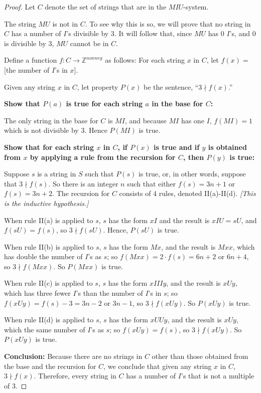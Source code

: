 \documentclass[14pt]{extarticle}
\newcommand{\Z}{\mathbb{Z}}
\begin{document}
\begin{proof}
Let $C$ denote the set of strings that are in the $M I U$-system.

The string $MU$ is not in $C$. To see why this is so, we will prove that no string in $C$ has a number of $I$'s 
divisible by 3. It will follow that, since $MU$ has 0 $I$'s, and 0 is divisible by 3, $MU$  cannot be in $C$.

Define a function \(f: C \to \Z^{nonneg}\) as follows: For each string $x$ in $C$, let \(f(x) = \) [the number of $I$'s in $x$].

Given any string $x$ in $C$, let property $P(x)$ be the sentence, “\(3 \nmid f(x)\).”

{\bf Show that $P(a)$ is true for each string $a$ in the base for $C$:}

The only string in the base for $C$ is $MI$, and because $MI$ has one $I$, $f(MI) = 1$ which is not divisible by 3. Hence $P(MI)$ is true. 

{\bf Show that for each string $x$ in $C$, if $P(x)$ is true and if $y$ is obtained from $x$ by applying a rule 
from the recursion for $C$, then $P(y)$ is true:}

Suppose $s$ is a string in $S$ such that $P(s)$ is true, or, in other words, suppose that $3 \nmid f(s)$. So there 
is an integer $n$ such that either \(f(s) = 3n+1\) or \(f(s) = 3n+2\). The recursion for $C$ consists of 4 rules, 
denoted II(a)-II(d). {\it [This is the inductive hypothesis.]} 

When rule II(a) is applied to $s$, $s$ has the form $xI$ and the result is $xIU = sU$, and \(f(sU) = f(s)\), 
so \(3 \nmid f(sU)\). Hence, $P(sU)$ is true. 

When rule II(b) is applied to $s$, $s$ has the form $Mx$, and the result is $Mxx$, which has double the number of 
$I$'s as $s$; so \(f(Mxx) = 2 \cdot f(s) = 6n+2\) or $6n+4$, so \(3 \nmid f(Mxx)\). So $P(Mxx)$ is true.

When rule II(c) is applied to $s$, $s$ has the form $xIIIy$, and the result is $xUy$, which has three fewer 
$I$'s than the number of $I$'s in $s$; so \(f(xUy) = f(s) - 3 = 3n-2\) or $3n - 1$, so \(3 \nmid f(xUy)\). 
So $P(xUy)$ is true.

When rule II(d) is applied to $s$, $s$ has the form $xUUy$, and the result is $xUy$, which the same number of $I$'s as 
$s$; so \(f(xUy) = f(s)\), so \(3 \nmid f(xUy)\). So $P(xUy)$ is true.

{\bf Conclusion:} Because there are no strings in $C$ other than those obtained from the base and the recursion for $C$, we conclude that given any string $x$ in $C$, \(3 \nmid f(x)\). Therefore, every string in $C$ has a number of $I$'s that is not a multiple of 3.
\end{proof}
\end{document}
